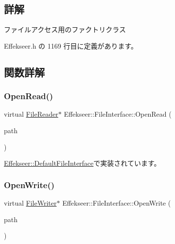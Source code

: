\subsection{詳解}
ファイルアクセス用のファクトリクラス 

 Effekseer.\+h の 1169 行目に定義があります。



\subsection{関数詳解}
\mbox{\label{class_effekseer_1_1_file_interface_ad8744ad57226d9a2ce74f6ef6e2f9a41}} 
\subsubsection{\texorpdfstring{Open\+Read()}{OpenRead()}}
{\footnotesize\ttfamily virtual \mbox{\hyperlink{class_effekseer_1_1_file_reader}{File\+Reader}}$\ast$ Effekseer\+::\+File\+Interface\+::\+Open\+Read (\begin{DoxyParamCaption}\item[{const \mbox{\hyperlink{_effekseer_8h_a50b026abea014b47854bcd835b3b6233}{E\+F\+K\+\_\+\+C\+H\+AR}} $\ast$}]{path }\end{DoxyParamCaption})\hspace{0.3cm}{\ttfamily [pure virtual]}}



\mbox{\hyperlink{class_effekseer_1_1_default_file_interface_a03d6224d1eb0124a21f42c578e447d51}{Effekseer\+::\+Default\+File\+Interface}}で実装されています。

\mbox{\label{class_effekseer_1_1_file_interface_a1e60cb81a5cae39b37e44570ef693d91}} 
\subsubsection{\texorpdfstring{Open\+Write()}{OpenWrite()}}
{\footnotesize\ttfamily virtual \mbox{\hyperlink{class_effekseer_1_1_file_writer}{File\+Writer}}$\ast$ Effekseer\+::\+File\+Interface\+::\+Open\+Write (\begin{DoxyParamCaption}\item[{const \mbox{\hyperlink{_effekseer_8h_a50b026abea014b47854bcd835b3b6233}{E\+F\+K\+\_\+\+C\+H\+AR}} $\ast$}]{path }\end{DoxyParamCaption})\hspace{0.3cm}{\ttfamily [pure virtual]}}



